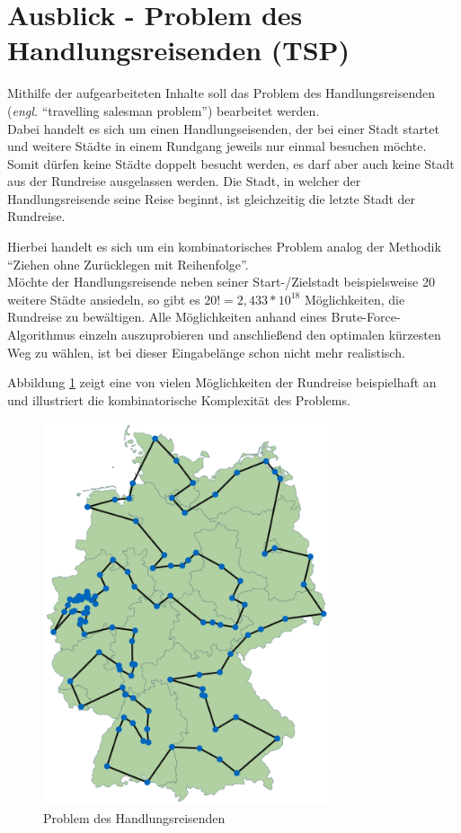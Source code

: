 
\section{Ausblick - Problem des Handlungsreisenden (TSP)}

Mithilfe der aufgearbeiteten Inhalte soll das Problem des Handlungsreisenden (\textit{engl.} \enquote{travelling salesman problem}) bearbeitet werden.\\
Dabei handelt es sich um einen Handlungseisenden, der bei einer Stadt startet und weitere Städte in einem Rundgang jeweils nur einmal besuchen möchte.
Somit dürfen keine Städte doppelt besucht werden, es darf aber auch keine Stadt aus der Rundreise ausgelassen werden.
Die Stadt, in welcher der Handlungsreisende seine Reise beginnt, ist gleichzeitig die letzte Stadt der Rundreise.

Hierbei handelt es sich um ein kombinatorisches Problem analog der Methodik \enquote{Ziehen ohne Zurücklegen mit Reihenfolge}.\\
Möchte der Handlungsreisende neben seiner Start-/Zielstadt beispielsweise 20 weitere Städte ansiedeln, so gibt es $20! = 2,433*10^18$ Möglichkeiten, die Rundreise zu bewältigen. Alle Möglichkeiten anhand eines Brute-Force-Algorithmus einzeln auszuprobieren und anschließend den optimalen kürzesten Weg zu wählen, ist bei dieser Eingabelänge schon nicht mehr realistisch.

Abbildung \ref{fig:tsp} zeigt eine von vielen Möglichkeiten der Rundreise beispielhaft an und illustriert die kombinatorische Komplexität des Problems.

\begin{figure}[H]
\centering
\includegraphics[width=0.75\textwidth]{img/tsp.png}
\caption{Problem des Handlungsreisenden}
\label{fig:tsp}
\end{figure}


